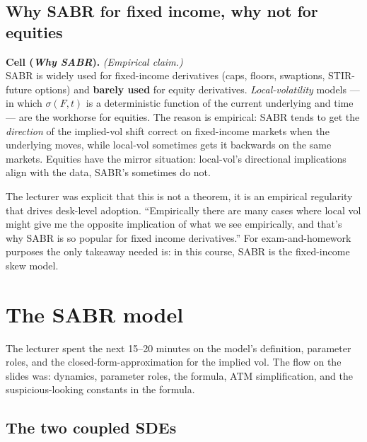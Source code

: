 \subsection{Why SABR for fixed income, why not for equities}\label{L7-sec:sabrvsfi}

\begin{keyblock}
\textbf{Cell (\emph{Why SABR}).}
\emph{(Empirical claim.)}\\
SABR is widely used for fixed-income derivatives (caps, floors,
swaptions, STIR-future options) and \textbf{barely used} for equity
derivatives. \emph{Local-volatility} models --- in which $\sigma(F, t)$
is a deterministic function of the current underlying and time --- are
the workhorse for equities. The reason is empirical: SABR tends to
get the \emph{direction} of the implied-vol shift correct on
fixed-income markets when the underlying moves, while local-vol
sometimes gets it backwards on the same markets. Equities have the
mirror situation: local-vol's directional implications align with the
data, SABR's sometimes do not.
\end{keyblock}

The lecturer was explicit that this is not a theorem, it is an
empirical regularity that drives desk-level adoption. ``Empirically
there are many cases where local vol might give me the opposite
implication of what we see empirically, and that's why SABR is so
popular for fixed income derivatives.'' For exam-and-homework
purposes the only takeaway needed is: in this course, SABR is the
fixed-income skew model.

\section{The SABR model}\label{L7-sec:sabrdef}

The lecturer spent the next 15--20 minutes on the model's definition,
parameter roles, and the closed-form-approximation for the implied
vol. The flow on the slides was: dynamics, parameter roles, the
formula, ATM simplification, and the suspicious-looking constants
in the formula.

\subsection{The two coupled SDEs}\label{L7-sec:sabrSDE}

